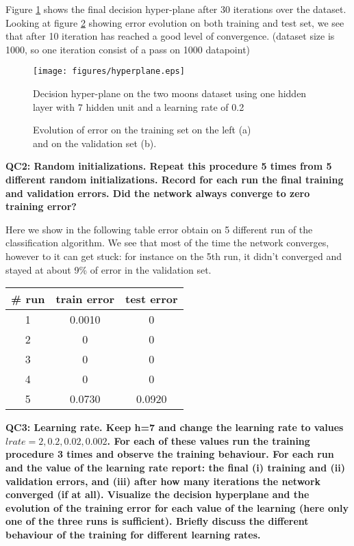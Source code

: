 \documentclass[a4paper,11pt]{exam}
\begin{document}
Figure \ref{hyperplane} shows the final decision hyper-plane after 30 iterations over the dataset. Looking at figure \ref{error} showing error evolution on both training and test set, we see that after 10 iteration has reached a good level of convergence. (dataset size is 1000, so one iteration consist of a pass on 1000 datapoint)\\ 

\begin{figure}[!h]
\centering
\texttt{[image: figures/hyperplane.eps]}
\caption{Decision hyper-plane on the two moons dataset using one hidden layer with 7 hidden unit and  a learning rate of 0.2}    
\label{hyperplane}
\end{figure}

\begin{figure}[!h]%
    \centering
    \qquad
    \caption{Evolution of error on the training set on the left (a)\\
     and  on the validation set (b).}%
    \label{error}%
\end{figure}

\textbf{QC2: Random initializations. Repeat this procedure 5 times from 5 different random initializations. Record for each run the final training and validation errors. Did the network always converge to zero training error?\\}

Here we show in the following table error obtain on 5 different run of the classification algorithm. We see that most of the time the network converges, however to it can get stuck: for instance on the 5th run, it didn't converged and stayed at about 9\% of error in the validation set. 
\begin{center}
\begin{tabular}{ c | c | c }
	\# run & train error & test error \\
	\hline
	   1 & 0.0010 & 0\\
           2 & 0 & 0\\
         3 & 0 & 0\\
         4 & 0 & 0\\
    	 5 & 0.0730 & 0.0920\\
	 \hline
\end{tabular}
\end{center}

\textbf{QC3: Learning rate. Keep h=7 and change the learning rate to values $lrate = {2, 0.2, 0.02, 0.002}$. For each of these values run the training procedure 3 times and observe the training behaviour. For each run and the value of the learning rate report: the final (i) training and (ii) validation errors, and (iii) after how many iterations the network converged (if at all). Visualize the decision hyperplane and the evolution of the training error for each value of the learning (here only one of the three runs is sufficient). Briefly discuss the different behaviour of the training for different learning rates.\\}
\end{document}
